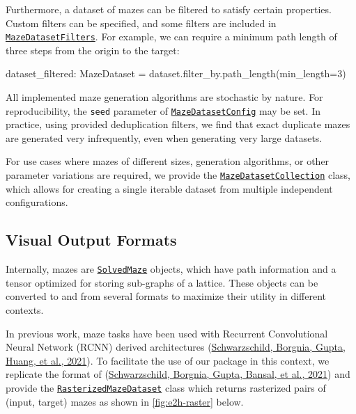 \documentclass[10pt,a4paper,onecolumn]{article}
\newenvironment{Shaded}{}{}
\newcommand{\DecValTok}[1]{\textcolor[rgb]{0.25,0.63,0.44}{#1}}
\newcommand{\NormalTok}[1]{#1}
\newcommand{\OperatorTok}[1]{\textcolor[rgb]{0.40,0.40,0.40}{#1}}
\begin{document}
Furthermore, a dataset of mazes can be filtered to satisfy certain
properties. Custom filters can be specified, and some filters are
included in
\href{https://understanding-search.github.io/maze-dataset/maze_dataset/dataset/filters.html\#MazeDatasetFilters}{\texttt{MazeDatasetFilters}}.
For example, we can require a minimum path length of three steps from
the origin to the target:

\begin{Shaded}
\begin{Highlighting}[]
\NormalTok{dataset\_filtered: MazeDataset }\OperatorTok{=}\NormalTok{ dataset.filter\_by.path\_length(min\_length}\OperatorTok{=}\DecValTok{3}\NormalTok{)}
\end{Highlighting}
\end{Shaded}

All implemented maze generation algorithms are stochastic by nature. For
reproducibility, the \texttt{seed} parameter of
\href{https://understanding-search.github.io/maze-dataset/maze_dataset.html\#MazeDatasetConfig}{\texttt{MazeDatasetConfig}}
may be set. In practice, using provided deduplication filters, we find
that exact duplicate mazes are generated very infrequently, even when
generating very large datasets.

For use cases where mazes of different sizes, generation algorithms, or
other parameter variations are required, we provide the
\href{https://understanding-search.github.io/maze-dataset/maze_dataset/dataset/collected_dataset.html\#MazeDatasetCollection}{\texttt{MazeDatasetCollection}}
class, which allows for creating a single iterable dataset from multiple
independent configurations.

\hypertarget{visual-output-formats}{%
\subsection{Visual Output Formats}\label{visual-output-formats}}

Internally, mazes are
\href{https://understanding-search.github.io/maze-dataset/maze_dataset.html\#SolvedMaze}{\texttt{SolvedMaze}}
objects, which have path information and a tensor optimized for storing
sub-graphs of a lattice. These objects can be converted to and from
several formats to maximize their utility in different contexts.



In previous work, maze tasks have been used with Recurrent Convolutional
Neural Network (RCNN) derived architectures
(\protect\hyperlink{ref-deepthinking}{Schwarzschild, Borgnia, Gupta,
Huang, et al., 2021}). To facilitate the use of our package in this
context, we replicate the format of
(\protect\hyperlink{ref-easy_to_hard}{Schwarzschild, Borgnia, Gupta,
Bansal, et al., 2021}) and provide the
\href{https://understanding-search.github.io/maze-dataset/maze_dataset/dataset/rasterized.html\#RasterizedMazeDataset}{\texttt{RasterizedMazeDataset}}
class which returns rasterized pairs of (input, target) mazes as shown
in \autoref{fig:e2h-raster} below.
\end{document}

